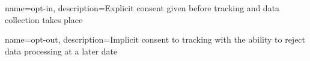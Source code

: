 {   
    name={opt-in},
    description={Explicit consent given before tracking and data collection takes place}
}

{   
    name={opt-out},
    description={Implicit consent to tracking with the ability to reject data processing at a later date}
}


